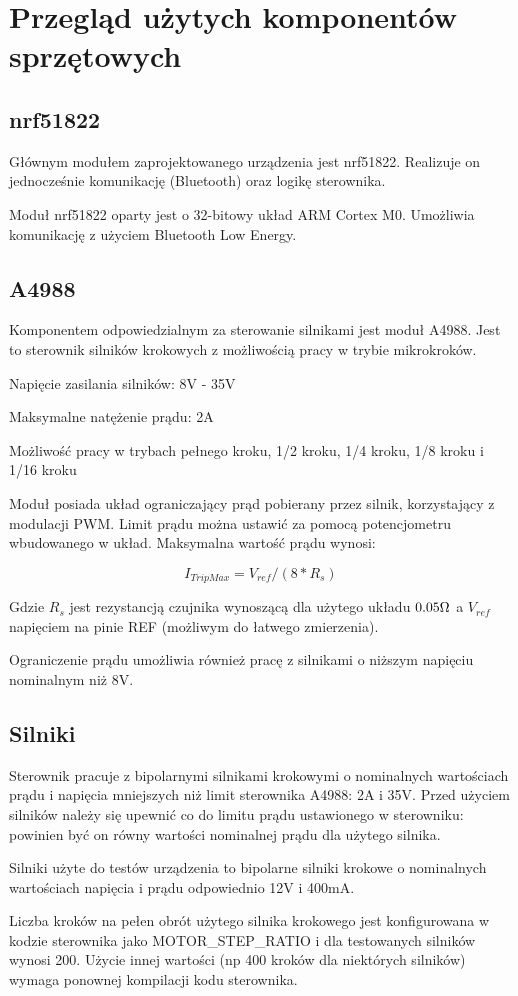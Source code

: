\section{Przegląd użytych komponentów sprzętowych}

\subsection{nrf51822}

Głównym modułem zaprojektowanego urządzenia jest nrf51822. Realizuje on
jednocześnie komunikację (Bluetooth) oraz logikę sterownika.

Moduł nrf51822 oparty jest o 32-bitowy układ ARM Cortex M0. Umożliwia
komunikację z użyciem Bluetooth Low Energy.

\subsection{A4988}

Komponentem odpowiedzialnym za sterowanie silnikami jest moduł A4988. Jest to
sterownik silników krokowych z możliwością pracy w trybie mikrokroków.

Napięcie zasilania silników: 8V - 35V

Maksymalne natężenie prądu: 2A

Możliwość pracy w trybach pełnego kroku, 1/2 kroku, 1/4 kroku, 1/8 kroku
i 1/16 kroku

Moduł posiada układ ograniczający prąd pobierany przez silnik, korzystający
z modulacji PWM. Limit prądu można ustawić za pomocą potencjometru wbudowanego
w układ.  Maksymalna wartość prądu wynosi:

$$I_{TripMax} = V_{ref}/(8*R_s)$$

Gdzie $R_s$ jest rezystancją czujnika wynoszącą dla użytego układu $0.05\ohm$
a $V_{ref}$ napięciem na pinie REF (możliwym do łatwego zmierzenia).

Ograniczenie prądu umożliwia również pracę z silnikami o niższym napięciu
nominalnym niż 8V.

\subsection{Silniki}

Sterownik pracuje z bipolarnymi silnikami krokowymi o nominalnych wartościach
prądu i napięcia mniejszych niż limit sterownika A4988: 2A i 35V. Przed użyciem
silników należy się upewnić co do limitu prądu ustawionego w sterowniku:
powinien być on równy wartości nominalnej prądu dla użytego silnika.

Silniki użyte do testów urządzenia to bipolarne silniki krokowe o nominalnych
wartościach napięcia i prądu odpowiednio 12V i 400mA.

Liczba kroków na pełen obrót użytego silnika krokowego jest konfigurowana w kodzie sterownika
jako MOTOR\_STEP\_RATIO i dla testowanych silników wynosi 200. Użycie innej
wartości (np 400 kroków dla niektórych silników) wymaga ponownej kompilacji
kodu sterownika.
